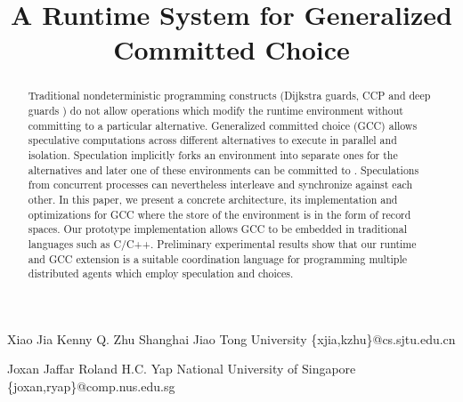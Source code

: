 \documentclass[preprint,10pt]{sigplanconf}
\begin{document}
\copyrightdata{[to be supplied]} 


\title{A Runtime System for Generalized Committed Choice}

\authorinfo
{Xiao Jia \hspace*{1cm} Kenny Q. Zhu}
{Shanghai Jiao Tong University}
{\{xjia,kzhu\}@cs.sjtu.edu.cn}

\authorinfo
{Joxan Jaffar \hspace*{1cm} Roland H.C. Yap}
{National University of Singapore}
{\{joxan,ryap\}@comp.nus.edu.sg}

\maketitle

\begin{abstract}
Traditional nondeterministic programming constructs 
  (Dijkstra guards,
CCP \cite{Saraswat:CCP} 
  and deep guards \cite{Smolka94:OzCalculus}) 
  do not allow operations which modify the runtime environment 
  without committing to a particular alternative. 
Generalized committed choice (GCC) 
  allows speculative computations across different alternatives 
  to execute in parallel and isolation. 
Speculation implicitly forks 
  an environment into separate ones for the alternatives and 
  later one of these environments can be committed to \cite{JaffarYZ07}. 
Speculations from concurrent processes can nevertheless interleave and 
  synchronize against each other. 
In this paper, we present a concrete architecture, 
  its implementation and optimizations for GCC where the store of 
  the environment is in the form of record spaces. 
Our prototype implementation allows GCC to be embedded in traditional 
  languages such as C/C++. 
Preliminary experimental results show that our runtime and GCC extension 
  is a suitable coordination language for programming multiple 
  distributed agents which employ speculation and choices. 
\end{abstract}

% 
% 
\end{document}
